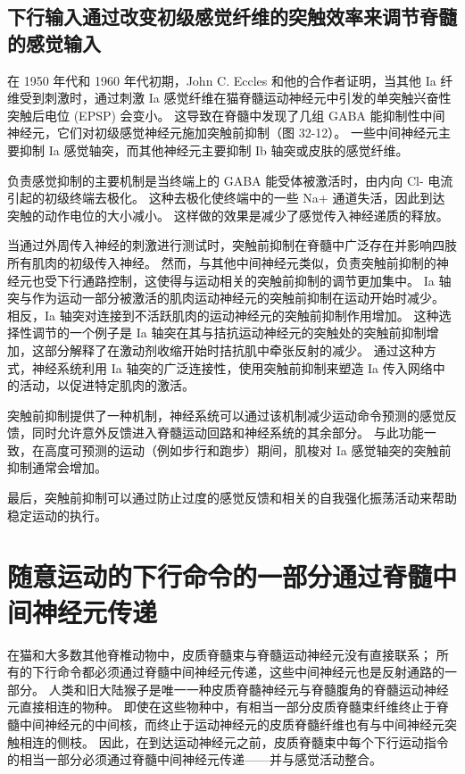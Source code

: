 \subsection{下行输入通过改变初级感觉纤维的突触效率来调节脊髓的感觉输入}
在 1950 年代和 1960 年代初期，John C. Eccles 和他的合作者证明，当其他 Ia 纤维受到刺激时，通过刺激 Ia 感觉纤维在猫脊髓运动神经元中引发的单突触兴奋性突触后电位 (EPSP) 会变小。 这导致在脊髓中发现了几组 GABA 能抑制性中间神经元，它们对初级感觉神经元施加突触前抑制（图 32-12）。 一些中间神经元主要抑制 Ia 感觉轴突，而其他神经元主要抑制 Ib 轴突或皮肤的感觉纤维。

负责感觉抑制的主要机制是当终端上的 GABA 能受体被激活时，由内向 Cl- 电流引起的初级终端去极化。 这种去极化使终端中的一些 Na+ 通道失活，因此到达突触的动作电位的大小减小。 这样做的效果是减少了感觉传入神经递质的释放。

当通过外周传入神经的刺激进行测试时，突触前抑制在脊髓中广泛存在并影响四肢所有肌肉的初级传入神经。 然而，与其他中间神经元类似，负责突触前抑制的神经元也受下行通路控制，这使得与运动相关的突触前抑制的调节更加集中。 Ia 轴突与作为运动一部分被激活的肌肉运动神经元的突触前抑制在运动开始时减少。 相反，Ia 轴突对连接到不活跃肌肉的运动神经元的突触前抑制作用增加。 这种选择性调节的一个例子是 Ia 轴突在其与拮抗运动神经元的突触处的突触前抑制增加，这部分解释了在激动剂收缩开始时拮抗肌中牵张反射的减少。 通过这种方式，神经系统利用 Ia 轴突的广泛连接性，使用突触前抑制来塑造 Ia 传入网络中的活动，以促进特定肌肉的激活。

突触前抑制提供了一种机制，神经系统可以通过该机制减少运动命令预测的感觉反馈，同时允许意外反馈进入脊髓运动回路和神经系统的其余部分。 与此功能一致，在高度可预测的运动（例如步行和跑步）期间，肌梭对 Ia 感觉轴突的突触前抑制通常会增加。

最后，突触前抑制可以通过防止过度的感觉反馈和相关的自我强化振荡活动来帮助稳定运动的执行。


\section{随意运动的下行命令的一部分通过脊髓中间神经元传递}
在猫和大多数其他脊椎动物中，皮质脊髓束与脊髓运动神经元没有直接联系； 所有的下行命令都必须通过脊髓中间神经元传递，这些中间神经元也是反射通路的一部分。 人类和旧大陆猴子是唯一一种皮质脊髓神经元与脊髓腹角的脊髓运动神经元直接相连的物种。 即使在这些物种中，有相当一部分皮质脊髓束纤维终止于脊髓中间神经元的中间核，而终止于运动神经元的皮质脊髓纤维也有与中间神经元突触相连的侧枝。 因此，在到达运动神经元之前，皮质脊髓束中每个下行运动指令的相当一部分必须通过脊髓中间神经元传递——并与感觉活动整合。

